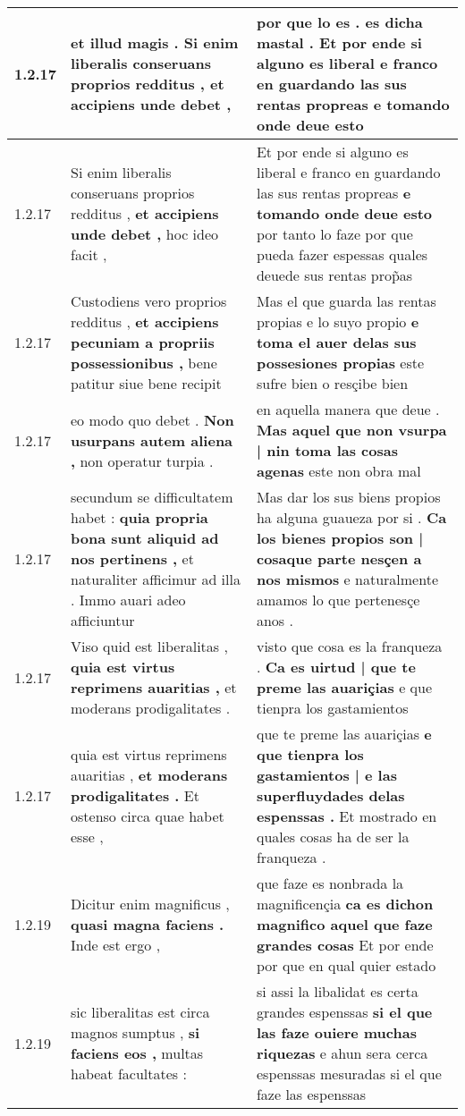 \begin{tabular}{|p{1cm}|p{6.5cm}|p{6.5cm}|}
1.2.17 & et illud magis . \textbf{ Si enim liberalis conseruans proprios redditus , } et accipiens unde debet , & por que lo es . es dicha mastal . \textbf{ Et por ende si alguno es liberal e franco en guardando las sus rentas propreas } e tomando onde deue esto \\\hline
1.2.17 & Si enim liberalis conseruans proprios redditus , \textbf{ et accipiens unde debet , } hoc ideo facit , & Et por ende si alguno es liberal e franco en guardando las sus rentas propreas \textbf{ e tomando onde deue esto } por tanto lo faze por que pueda fazer espessas quales deuede sus rentas prop̃as \\\hline
1.2.17 & Custodiens vero proprios redditus , \textbf{ et accipiens pecuniam a propriis possessionibus , } bene patitur siue bene recipit & Mas el que guarda las rentas propias e lo suyo propio \textbf{ e toma el auer delas sus possesiones propias } este sufre bien o resçibe bien \\\hline
1.2.17 & eo modo quo debet . \textbf{ Non usurpans autem aliena , } non operatur turpia . & en aquella manera que deue . \textbf{ Mas aquel que non vsurpa | nin toma las cosas agenas } este non obra mal \\\hline
1.2.17 & secundum se difficultatem habet : \textbf{ quia propria bona sunt aliquid ad nos pertinens , } et naturaliter afficimur ad illa . Immo auari adeo afficiuntur & Mas dar los sus biens propios ha alguna guaueza por si . \textbf{ Ca los bienes propios son | cosaque parte nesçen a nos mismos } e naturalmente amamos lo que pertenesçe anos . \\\hline
1.2.17 & Viso quid est liberalitas , \textbf{ quia est virtus reprimens auaritias , } et moderans prodigalitates . & visto que cosa es la franqueza . \textbf{ Ca es uirtud | que te preme las auariçias } e que tienpra los gastamientos \\\hline
1.2.17 & quia est virtus reprimens auaritias , \textbf{ et moderans prodigalitates . } Et ostenso circa quae habet esse , & que te preme las auariçias \textbf{ e que tienpra los gastamientos | e las superfluydades delas espenssas . } Et mostrado en quales cosas ha de ser la franqueza . \\\hline
1.2.19 & Dicitur enim magnificus , \textbf{ quasi magna faciens . } Inde est ergo , & que faze es nonbrada la magnificençia \textbf{ ca es dichon magnifico aquel que faze grandes cosas } Et por ende por que en qual quier estado \\\hline
1.2.19 & sic liberalitas est circa magnos sumptus , \textbf{ si faciens eos , } multas habeat facultates : & si assi la libalidat es certa grandes espenssas \textbf{ si el que las faze ouiere muchas riquezas } e ahun sera cerca espenssas mesuradas si el que faze las espenssas \\\hline

\end{tabular}
